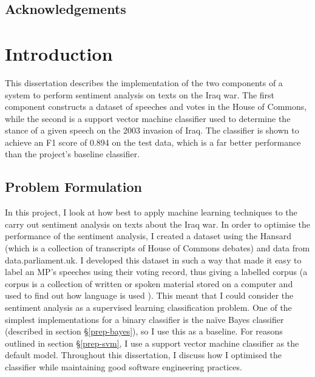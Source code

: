 \documentclass[12pt,a4paper,twoside,openright]{report}
\begin{document}
\setcounter{tocdepth}{4}
\setcounter{secnumdepth}{4}
\tableofcontents

\listoffigures

\newpage
\section*{Acknowledgements}





\pagestyle{headings}

\chapter{Introduction}

This dissertation describes the implementation of the two components of a system to perform sentiment analysis on texts on the Iraq war. The first component constructs a dataset of speeches and votes in the House of Commons, while the second is a support vector machine classifier used to determine the stance of a given speech on the 2003 invasion of Iraq. The classifier is shown to achieve an F1 score of 0.894 on the test data, which is a far better performance than the project's baseline classifier.

\section{Problem Formulation} \label{intro-challenges}

In this project, I look at how best to apply machine learning techniques to the carry out sentiment analysis on texts about the Iraq war. In order to optimise the performance of the sentiment analysis, I created a dataset using the Hansard (which is a collection of transcripts of House of Commons debates) and data from data.parliament.uk. I developed this dataset in such a way that made it easy to label an MP's speeches using their voting record, thus giving a labelled corpus (a corpus is a collection of written or spoken material stored on a computer and used to find out how language is used \cite{corpus_definition}). This meant that I could consider the sentiment analysis as a supervised learning classification problem. One of the simplest implementations for a binary classifier is the na\"{i}ve Bayes classifier (described in section \S\ref{prep-bayes}), so I use this as a baseline. For reasons outlined in section \S\ref{prep-svm}, I use a support vector machine classifier as the default model. Throughout this dissertation, I discuss how I optimised the classifier while maintaining good software engineering practices.
\end{document}
